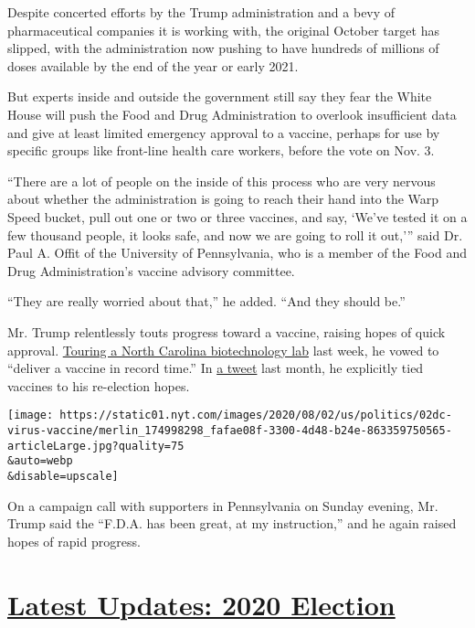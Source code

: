 Despite concerted efforts by the Trump administration and a bevy of
pharmaceutical companies it is working with, the original October target
has slipped, with the administration now pushing to have hundreds of
millions of doses available by the end of the year or early 2021.

But experts inside and outside the government still say they fear the
White House will push the Food and Drug Administration to overlook
insufficient data and give at least limited emergency approval to a
vaccine, perhaps for use by specific groups like front-line health care
workers, before the vote on Nov. 3.

``There are a lot of people on the inside of this process who are very
nervous about whether the administration is going to reach their hand
into the Warp Speed bucket, pull out one or two or three vaccines, and
say, `We've tested it on a few thousand people, it looks safe, and now
we are going to roll it out,''' said Dr. Paul A. Offit of the University
of Pennsylvania, who is a member of the Food and Drug Administration's
vaccine advisory committee.

``They are really worried about that,'' he added. ``And they should
be.''

Mr. Trump relentlessly touts progress toward a vaccine, raising hopes of
quick approval.
\href{https://www.nytimes.com/video/us/100000007258794/trump-boasts-vaccine-progress-north-carolina.html}{Touring
a North Carolina biotechnology lab} last week, he vowed to ``deliver a
vaccine in record time.'' In
\href{https://twitter.com/realdonaldtrump/status/1283566319405797378}{a
tweet} last month, he explicitly tied vaccines to his re-election hopes.

\texttt{[image: https://static01.nyt.com/images/2020/08/02/us/politics/02dc-virus-vaccine/merlin\_174998298\_fafae08f-3300-4d48-b24e-863359750565-articleLarge.jpg?quality=75\\\&auto=webp\\\&disable=upscale]}

On a campaign call with supporters in Pennsylvania on Sunday evening,
Mr. Trump said the ``F.D.A. has been great, at my instruction,'' and he
again raised hopes of rapid progress.

\hypertarget{latest-updates-2020-election}{%
\section{\texorpdfstring{\href{https://www.nytimes.com/2020/07/31/us/elections/biden-vs-trump.html?action=click\&pgtype=Article\&state=default\&region=MAIN_CONTENT_1\&context=storylines_live_updates}{Latest
Updates: 2020
Election}}{Latest Updates: 2020 Election}}\label{latest-updates-2020-election}}

